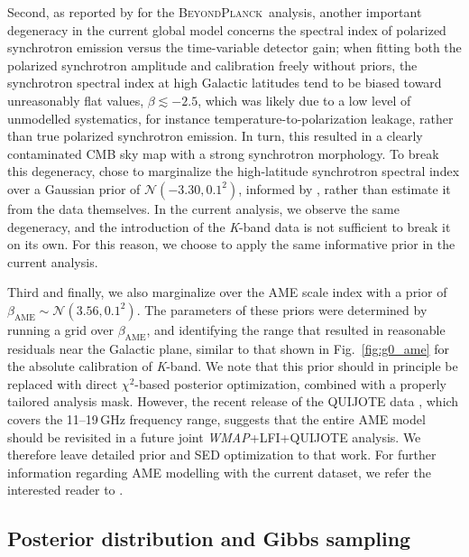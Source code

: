 \documentclass[twocolumn]{../../common/aa}
\def\WMAP{\emph{WMAP}}
\newcommand{\BP}{\textsc{BeyondPlanck}}
\newcommand{\K}[0]{\textit K}
\begin{document}
Second, as reported by \citet{bp14} for the \BP\ analysis, another important degeneracy in the current global model concerns the spectral index of polarized synchrotron emission versus the time-variable detector gain; when fitting both the polarized synchrotron amplitude and calibration freely without priors, the synchrotron spectral index at high Galactic latitudes tend to be biased toward unreasonably flat values, $\beta \lesssim -2.5$, which was likely due to a low level of unmodelled systematics, for instance temperature-to-polarization leakage, rather than true polarized synchrotron emission. In turn, this resulted in a clearly contaminated CMB sky map with a strong synchrotron morphology. To break this degeneracy, \citet{bp14} chose to marginalize the high-latitude synchrotron spectral index over a Gaussian prior of $\mathcal N(-3.30,0.1^2)$, informed by \citet{planck2016-l05}, rather than estimate it from the data themselves. In the current analysis, we observe the same degeneracy, and the introduction of the \K-band data is not sufficient to break it on its own. For this reason, we choose to apply the same informative prior in the current analysis.

Third and finally, we also marginalize over the AME scale index with a prior of $\beta_{\mathrm{AME}}\sim\mathcal N(3.56, 0.1^2)$. The parameters of these priors were determined by running a grid over $\beta_{\mathrm{AME}}$, and identifying the range that resulted in reasonable residuals near the Galactic plane, similar to that shown in Fig.~\ref{fig:g0_ame} for the absolute calibration of \K-band. We note that this prior should in principle be replaced with direct $\chi^2$-based posterior optimization, combined with a properly tailored analysis mask. However, the recent release of the QUIJOTE data \citep{QUIJOTE_IV}, which covers the 11--19\,GHz frequency range, suggests that the entire AME model should be revisited in a future joint \WMAP+LFI+QUIJOTE analysis. We therefore leave detailed prior and SED optimization to that work. For further information regarding AME modelling with the current dataset, we refer the interested reader to \citet{watts2023_ame}.

\subsection{Posterior distribution and Gibbs sampling}
\end{document}
